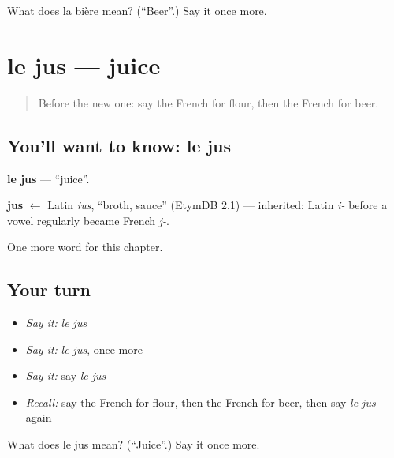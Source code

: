\begin{tcolorbox}[breakable,colback=teal!4,colframe=teal!35!black,title={Before you move on}]
What does la bière mean? (\textquotedblleft{}Beer\textquotedblright{}.) Say it once more.
\end{tcolorbox}
\section[le jus]{le jus — juice}

\label{lesson:FR-C121-jus}



\begin{quote}
Before the new one: say the French for flour, then the French for beer.
\end{quote}

\subsection*{You'll want to know: le jus}
\textbf{le jus} — \textquotedblleft{}juice\textquotedblright{}.

\begin{cousinweb}
\textbf{jus} $\leftarrow$ Latin \emph{ius}, \textquotedblleft{}broth, sauce\textquotedblright{} (EtymDB 2.1) — inherited: Latin \emph{i-} before a vowel regularly became French \emph{j-}.
\end{cousinweb}

\begin{grammarlens}[title={What you've built}]
One more word for this chapter.
\end{grammarlens}

\subsection*{Your turn}
\begin{itemize}
\raggedright
  \item \emph{Say it:} \emph{le jus}
  \item \emph{Say it:} \emph{le jus}, once more
  \item \emph{Say it:} say \emph{le jus}
  \item \emph{Recall:} say the French for flour, then the French for beer, then say \emph{le jus} again
\end{itemize}

\begin{tcolorbox}[breakable,colback=teal!4,colframe=teal!35!black,title={Before you move on}]
What does le jus mean? (\textquotedblleft{}Juice\textquotedblright{}.) Say it once more.
\end{tcolorbox}
